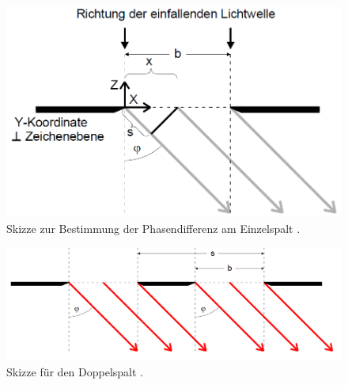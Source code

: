 \begin{figure}
	\centering
	\includegraphics[width=\linewidth-150pt,height=\textheight-150pt,keepaspectratio]{content/images/Einzelspalt.png}
	\caption{Skizze zur Bestimmung der Phasendifferenz am Einzelspalt \cite{V406}.}
	\label{fig:Einzelspalt}
\end{figure}

\begin{figure}
	\centering
	\includegraphics[width=\linewidth-70pt,height=\textheight-70pt,keepaspectratio]{content/images/Doppelspalt.png}
	\caption{Skizze für den Doppelspalt \cite{V406}.}
	\label{fig:Doppelspalt}
\end{figure}